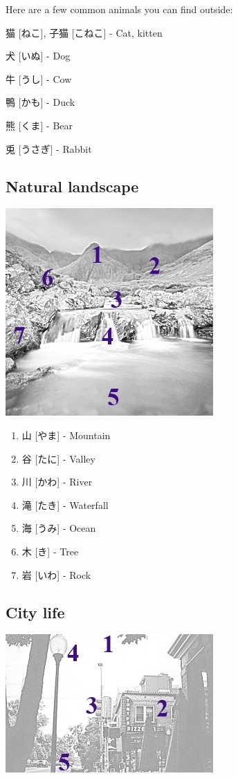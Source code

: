 \documentclass{article}
\begin{document}
\begin{CJK}{UTF8}{min}
\begin{multicols*}{3}
Here are a few common animals you can find outside:

\begin{colorize}
\item 猫 [ねこ], 子猫 [こねこ] - Cat, kitten
\item 犬 [いぬ] - Dog
\item 牛 [うし] - Cow
\item 鴨 [かも] - Duck
\item 熊 [くま] - Bear
\item 兎 [うさぎ] - Rabbit
\end{colorize}

\subsection{Natural landscape}

\includegraphics{nature}

\begin{enumerate}
\item 山 [やま] - Mountain
\item 谷 [たに] - Valley
\item 川 [かわ] - River
\item 滝 [たき] - Waterfall
\item 海 [うみ] - Ocean
\item 木 [き] - Tree
\item 岩 [いわ] - Rock
\end{enumerate}

\subsection{City life}

\includegraphics{city}


\end{multicols*}
\end{CJK}
\end{document}
